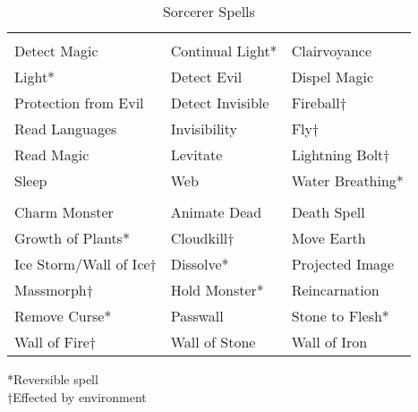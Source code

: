 \begin {table}[H]
  \caption{Sorcerer Spells}
  \begin{tabularx}{\columnwidth}{YYY}
	 &  & \\
	Detect Magic & Continual Light* & Clairvoyance\\
	Light* & Detect Evil & Dispel Magic\\
	Protection from Evil & Detect Invisible & Fireball†\\
	Read Languages & Invisibility & Fly†\\
	Read Magic & Levitate & Lightning Bolt†\\
	Sleep & Web & Water Breathing*\\
	 &  & \\
	Charm Monster & Animate Dead & Death Spell\\
	Growth of Plants* & Cloudkill† & Move Earth\\
	Ice Storm/Wall of Ice† & Dissolve* & Projected Image\\
	Massmorph† & Hold Monster* & Reincarnation\\
	Remove Curse* & Passwall & Stone to Flesh*\\
	Wall of Fire† & Wall of Stone & Wall of Iron\
	\end {tabularx}
	*Reversible spell\\
	†Effected by environment
\end {table}

